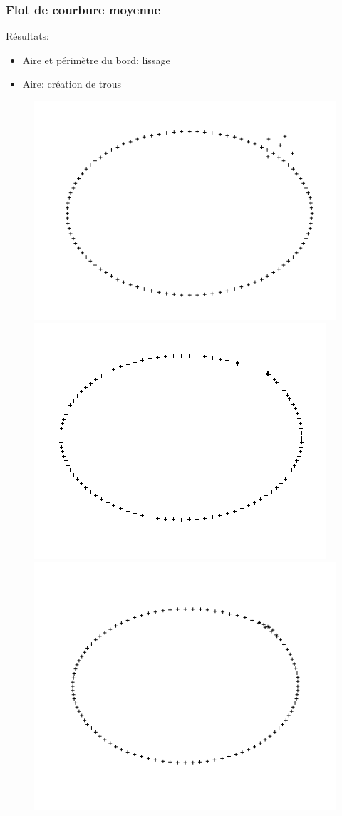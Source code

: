 \documentclass{beamer}
\begin{document}
\begin{frame}
    \frametitle{Flot de courbure moyenne}

    Résultats:
    \begin{itemize}
        \item Aire et périmètre du bord: lissage
        \item Aire: création de trous
    \end{itemize}

    \begin{figure}
        \centering
        \includegraphics[scale=0.22]{img/ellipse-outliers}
        \includegraphics[scale=0.22]{img/ellipse-outliers-area}
        \includegraphics[scale=0.22]{img/ellipse-outliers-perimeter}

\end{figure}
\end{frame}
\end{document}
